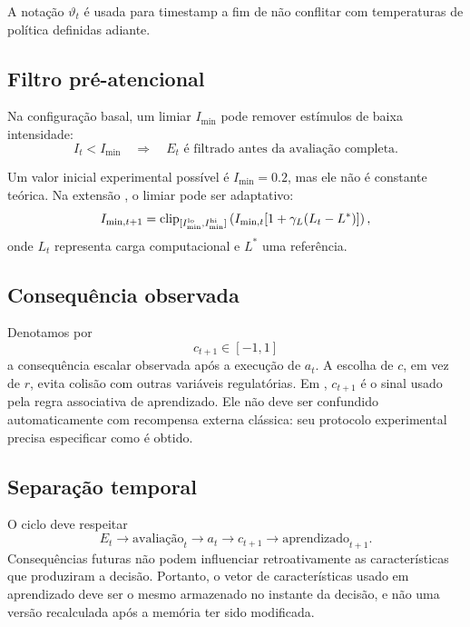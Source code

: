 A notação \(\vartheta_t\) é usada para timestamp a fim de não conflitar com temperaturas de política definidas adiante.

\subsection{Filtro pré-atencional}

Na configuração basal, um limiar \(I_{\min}\) pode remover estímulos de baixa intensidade:
\begin{equation}
I_t<I_{\min}\quad\Longrightarrow\quad E_t\text{ é filtrado antes da avaliação completa.}
\end{equation}

Um valor inicial experimental possível é \(I_{\min}=0.2\), mas ele não é constante teórica. Na extensão \EVPM, o limiar pode ser adaptativo:
\begin{equation}
I_{\min,t+1}=\operatorname{clip}_{[I_{\min}^{\rm lo},I_{\min}^{\rm hi}]}
\left(I_{\min,t}[1+\gamma_L(L_t-L^*)]\right),
\end{equation}
onde \(L_t\) representa carga computacional e \(L^*\) uma referência.

\subsection{Consequência observada}

Denotamos por
\begin{equation}
c_{t+1}\in[-1,1]
\label{eq:consequence}
\end{equation}
a consequência escalar observada após a execução de \(a_t\). A escolha de \(c\), em vez de \(r\), evita colisão com outras variáveis regulatórias. Em \EVPB, \(c_{t+1}\) é o sinal usado pela regra associativa de aprendizado. Ele não deve ser confundido automaticamente com recompensa externa clássica: seu protocolo experimental precisa especificar como é obtido.

\subsection{Separação temporal}

O ciclo deve respeitar
\[
E_t\rightarrow \text{avaliação}_t\rightarrow a_t\rightarrow c_{t+1}\rightarrow \text{aprendizado}_{t+1}.
\]
Consequências futuras não podem influenciar retroativamente as características que produziram a decisão. Portanto, o vetor de características usado em aprendizado deve ser o mesmo armazenado no instante da decisão, e não uma versão recalculada após a memória ter sido modificada.

